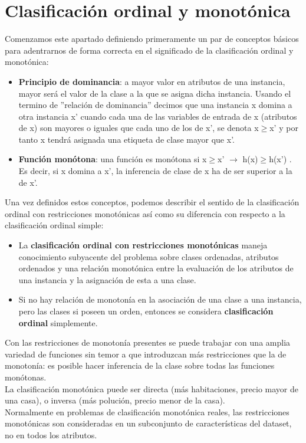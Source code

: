 \section{Clasificación ordinal y monotónica}

Comenzamos este apartado definiendo primeramente un par de conceptos básicos para adentrarnos de forma correcta en el significado
de la clasificación ordinal y monotónica: \cite{ref17}

\begin{itemize}
	\item \textbf{Principio de dominancia}: a mayor valor en atributos de una instancia, mayor será el
	valor de la clase a la que se asigna dicha instancia.
	Usando el termino de ''relación de dominancia'' decimos que una instancia x domina a
	otra instancia x' cuando cada una de las variables de entrada de x (atributos de x)
	son mayores o iguales que cada uno de los de x', se denota x$\geq$x' y por tanto
	x tendrá asignada una etiqueta de clase mayor que x'.
	\item \textbf{Función monótona}: una función es monótona si x$\geq$x' $\rightarrow$ h(x)$\ge$h(x') . Es decir, si x domina a x', la
	inferencia de clase de x ha de ser superior a la de x'.
\end{itemize}

Una vez definidos estos conceptos, podemos describir el sentido de la clasificación ordinal con restricciones monotónicas así como su diferencia con respecto a la clasificación ordinal simple:

\begin{itemize}
	\item La \textbf{clasificación ordinal con restricciones monotónicas} maneja conocimiento subyacente del
	problema sobre clases ordenadas, atributos ordenados y una relación monotónica entre
	la evaluación de los atributos de una instancia y la asignación de esta a una clase.
	\item Si no hay relación de monotonía en la asociación de una clase a una instancia, 
	pero las clases si poseen un orden, entonces se considera\textbf{ clasificación ordinal} simplemente.
\end{itemize}

Con las restricciones de monotonía presentes se puede trabajar con una amplia
variedad de funciones sin temor a que introduzcan más restricciones que 
la de monotonía: es posible hacer inferencia de la clase sobre todas las funciones
monótonas.\\
La clasificación monotónica puede ser directa (más habitaciones, precio mayor
de una casa), o inversa (más polución, precio menor de la casa).\\
Normalmente en problemas de clasificación monotónica reales, las restricciones
monotónicas son consideradas en un subconjunto de características del dataset, no en todos los atributos.

